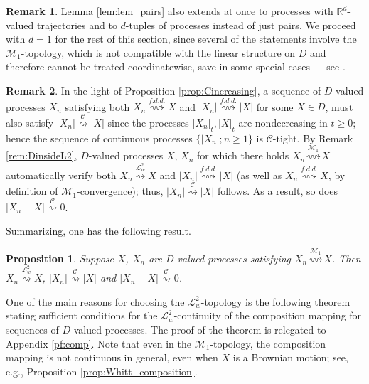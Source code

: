 \documentclass[final]{amsart}
\newtheorem{prop}[thm]{Proposition}
\theoremstyle{definition}
\newtheorem{rem}{Remark}[section]
\numberwithin{equation}{section}
\newcommand{\dR}{\ensuremath{\mathbb{R}}}
\newcommand{\cL}{\ensuremath{\mathcal{L}}}
\newcommand{\cM}{\ensuremath{\mathcal{M}}}
\begin{document}
\begin{rem}\label{rem:RdExtension2}
Lemma \ref{lem:lem_pairs} also extends at once to processes with $\dR^d$-valued trajectories
and to $d$-tuples of processes instead of just pairs.
We proceed with $d=1$ for the rest of this section, since several of the statements involve the $\mathcal{M}_1$-topology,
which is not compatible with the linear structure on $D$ and therefore cannot be treated coordinatewise, save in some special cases
--- see \citet{Whitt:2002}.
\end{rem}

\begin{rem}\label{rem:L2normtightness}
In the light of Proposition \ref{prop:Cincreasing}, a sequence of $D$-valued processes $X_n$ satisfying both
$X_n \stackrel{f.d.d.}{\rightsquigarrow} X$ and $|X_n| \stackrel{f.d.d.}{\rightsquigarrow} |X|$ for some $X\in D$,
must also satisfy $|X_n|  \stackrel{\mathcal{C}}{\rightsquigarrow} |X|$ since the processes $|X_n|_t, |X|_t$ are nondecreasing in $t\ge 0$; hence
the sequence of continuous processes $\bigl\{|X_n|; n\ge1\bigr\}$ is $\mathcal{C}$-tight.
By Remark \ref{rem:DinsideL2}, $D$-valued processes $X$, $X_n$ for which there holds
$X_n \stackrel{\mathcal{M}_1}{\rightsquigarrow} X$ automatically verify both $X_n\stackrel{\cL^2_w}{\rightsquigarrow} X$ and
$|X_n| \stackrel{f.d.d.}{\rightsquigarrow} |X| $ (as well as $X_n \stackrel{f.d.d.}{\rightsquigarrow} X$, by definition of
$\mathcal{M}_1$-convergence); thus, $|X_n| \stackrel{\mathcal{C}}{\rightsquigarrow} |X|$ follows.
As a result, so does $|X_n-X| \stackrel{\mathcal{C}}{\rightsquigarrow} 0$.
\end{rem}

Summarizing, one has the following result.

\begin{prop}\label{prop:norm}
Suppose $X$, $X_n$ are  $D$-valued processes satisfying $X_n \stackrel{\mathcal{M}_1}{\rightsquigarrow} X$.
Then $X_n\stackrel{\cL^2_w}{\rightsquigarrow} X$, $|X_n| \stackrel{\mathcal{C}}{\rightsquigarrow} |X|$
and $|X_n-X|  \stackrel{\mathcal{C}}{\rightsquigarrow} 0$.
\end{prop}

One of the main reasons for choosing the $\cL^2_w$-topology is the following theorem stating sufficient conditions for the $\cL^2_w$-continuity of the composition mapping
for sequences of $D$-valued processes.  The proof of the theorem is relegated to Appendix \ref{pf:comp}. Note that even in the $\cM_1$-topology, the composition mapping is not continuous in general, even when $X$ is a Brownian motion; see, e.g., Proposition \ref{prop:Whitt_composition}.
\end{document}
